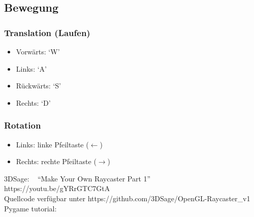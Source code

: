 \documentclass[a4paper]{article}
\begin{document}
\subsection{Bewegung}

\subsubsection{Translation (Laufen)}
\begin{itemize}
\item Vorwärts: `W'
\item Links: `A'
\item Rückwärts: `S'
\item Rechts: `D'
\end{itemize}

\subsubsection{Rotation}
\begin{itemize}
\item Links: linke Pfeiltaste ($\leftarrow$)
\item Rechts: rechte Pfeiltaste ($\rightarrow$)
\end{itemize}

\newpage

\begin{flushleft}
\begin{thebibliography}{99}
 3DSage: ~ ``Make Your Own Raycaster Part 1'' ~ https://youtu.be/gYRrGTC7GtA\\ Quellcode verfügbar unter https://github.com/3DSage/OpenGL-Raycaster\_v1
 Pygame tutorial: 	
\end{thebibliography}
\end{flushleft}
\end{document}
